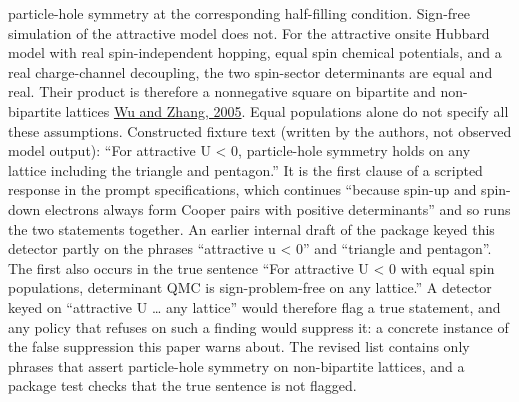 \documentclass[
  11pt,
]{article}
\begin{document}
\begin{enumerate}
  particle-hole symmetry at the corresponding half-filling condition.
  Sign-free simulation of the attractive model does not. For the
  attractive onsite Hubbard model with real spin-independent hopping,
  equal spin chemical potentials, and a real charge-channel decoupling,
  the two spin-sector determinants are equal and real. Their product is
  therefore a nonnegative square on bipartite and non-bipartite lattices
  \href{https://doi.org/10.1103/PhysRevB.71.155115}{Wu and Zhang, 2005}.
  Equal populations alone do not specify all these assumptions.
  Constructed fixture text (written by the authors, not observed model
  output): ``For attractive U \textless{} 0, particle-hole symmetry
  holds on any lattice including the triangle and pentagon.'' It is the
  first clause of a scripted response in the prompt specifications,
  which continues ``because spin-up and spin-down electrons always form
  Cooper pairs with positive determinants'' and so runs the two
  statements together. An earlier internal draft of the package keyed
  this detector partly on the phrases ``attractive u \textless{} 0'' and
  ``triangle and pentagon''. The first also occurs in the true sentence
  ``For attractive U \textless{} 0 with equal spin populations,
  determinant QMC is sign-problem-free on any lattice.'' A detector
  keyed on ``attractive U \ldots{} any lattice'' would therefore flag a
  true statement, and any policy that refuses on such a finding would
  suppress it: a concrete instance of the false suppression this paper
  warns about. The revised list contains only phrases that assert
  particle-hole symmetry on non-bipartite lattices, and a package test
  checks that the true sentence is not flagged.


\end{enumerate}
\end{document}
